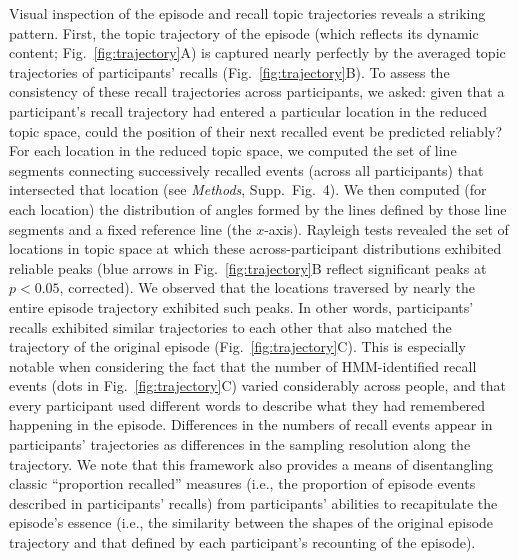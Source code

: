\documentclass[10pt]{article}
\newcommand{\arrows}{4}
\begin{document}
Visual inspection of the episode and recall topic trajectories reveals a striking pattern.  First, the topic trajectory of the episode (which reflects its dynamic content; Fig.~\ref{fig:trajectory}A) is captured nearly perfectly by the averaged topic trajectories of participants' recalls (Fig.~\ref{fig:trajectory}B).  To assess the consistency of these recall trajectories across participants, we asked: given that a participant's recall trajectory had entered a particular location in the reduced topic space, could the position of their next recalled event be predicted reliably?  For each location in the reduced topic space, we computed the set of line segments connecting successively recalled events (across all participants) that intersected that location (see \textit{Methods}, Supp.\ Fig.~\arrows).  We then computed (for each location) the distribution of angles formed by the lines defined by those line segments and a fixed reference line (the $x$-axis).  Rayleigh tests revealed the set of locations in topic space at which these across-participant distributions exhibited reliable peaks (blue arrows in Fig.~\ref{fig:trajectory}B reflect significant peaks at $p < 0.05$, corrected).  We observed that the locations traversed by nearly the entire episode trajectory exhibited such peaks.  In other words, participants' recalls exhibited similar trajectories to each other that also matched the trajectory of the original episode (Fig.~\ref{fig:trajectory}C).  This is especially notable when considering the fact that the number of HMM-identified recall events (dots in Fig.~\ref{fig:trajectory}C) varied considerably across people, and that every participant used different words to describe what they had remembered happening in the episode.  Differences in the numbers of recall events appear in participants' trajectories as differences in the sampling resolution along the trajectory.  We note that this framework also provides a means of disentangling classic ``proportion recalled'' measures (i.e., the proportion of episode events described in participants' recalls) from participants' abilities to recapitulate the episode's essence (i.e., the similarity between the shapes of the original episode trajectory and that defined by each participant's recounting of the episode).
\end{document}
